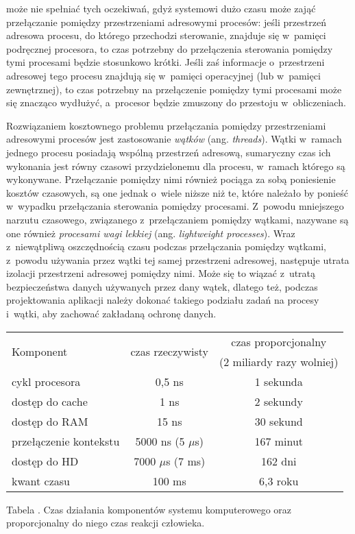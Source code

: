 \documentclass[12pt]{mwart}
\newcounter{tabmain}
\newcommand{\mytabcaption}[1]{ \begin{center}Tabela \arabic{tabmain}. #1.\end{center} \addtocounter{tabmain}{1} }
\begin{document}
	może nie spełniać tych oczekiwań, gdyż systemowi dużo czasu może zająć przełączanie pomiędzy przestrzeniami adresowymi procesów:
	jeśli przestrzeń adresowa procesu, do którego przechodzi sterowanie, znajduje się w~pamięci podręcznej procesora, to czas potrzebny do 
	przełączenia sterowania pomiędzy tymi procesami będzie stosunkowo krótki. Jeśli zaś informacje o~przestrzeni adresowej tego procesu znajdują się
	w~pamięci operacyjnej (lub w~pamięci zewnętrznej), to czas potrzebny na przełączenie pomiędzy tymi procesami może się znacząco wydłużyć,
	a~procesor będzie zmuszony do przestoju w~obliczeniach.
\par
%
\indent
	Rozwiązaniem kosztownego problemu przełączania pomiędzy przestrzeniami adresowymi procesów jest zastosowanie \emph{wątków} (ang. \emph{threads}).
	Wątki w~ramach jednego procesu posiadają wspólną przestrzeń adresową, sumaryczny czas ich wykonania jest równy czasowi przydzielonemu dla 
	procesu, w~ramach którego są wykonywane. Przełączanie pomiędzy nimi również pociąga za sobą poniesienie kosztów czasowych, są one jednak
	o~wiele niższe niż te, które należało by ponieść w~wypadku przełączania sterowania pomiędzy procesami. Z~powodu mniejszego narzutu czasowego,
	związanego z~przełączaniem pomiędzy wątkami, nazywane są one również \emph{procesami wagi lekkiej} (ang. \emph{lightweight processes}).
	Wraz z~niewątpliwą oszczędnością czasu podczas przełączania pomiędzy wątkami, z~powodu używania przez wątki tej samej przestrzeni adresowej,
	następuje utrata izolacji przestrzeni adresowej pomiędzy nimi. Może się to wiązać z~utratą bezpieczeństwa danych używanych przez dany wątek,
	dlatego też, podczas projektowania aplikacji należy dokonać takiego podziału zadań na procesy i~wątki, aby zachować zakładaną ochronę danych.
\par
%
\indent
	\begin{center}
	\centering
	\begin{tabular}{|l|c|c|} \hline
		\multirow{2}{*}{Komponent} & \multirow{2}{*}{czas rzeczywisty}	& czas proporcjonalny \\ 
					  &                   & (2 miliardy razy wolniej) \\ \hline
		cykl procesora	& 0,5 ns & 1 sekunda \\\hline
		dostęp do cache & 1 ns & 2 sekundy \\\hline
		dostęp do RAM	  & 15 ns & 30 sekund \\\hline
		przełączenie kontekstu & 5000 ns (5 $\mu$s) & 167 minut \\\hline
		dostęp do HD		& 7000 $\mu$s (7 ms) & 162 dni \\\hline
		kwant czasu 		& 100 ms	& 6,3 roku \\\hline
	\end{tabular}
		\mytabcaption{Czas działania komponentów systemu komputerowego oraz proporcjonalny do niego czas reakcji człowieka}
	\label{tab:timecomp}
	\end{center}
\end{document}
